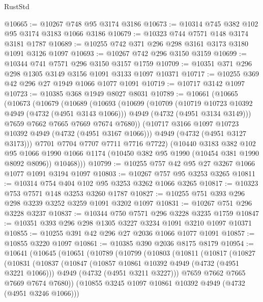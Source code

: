\begin{lexlean}{RustStd}
\begin{coremodule}
@10665 := @10267 @748 @95 @3174 @3186
@10673 := @10314 @745 @382 @102 @95 @3174 @3183 @1066 @3186
@10679 := @10323 @744 @7571 @148 @3174 @3181 @1787
@10689 := @10255 @742 @371 @296 @298 @3161 @3173 @3180 @1091 @3126 @1097
@10693 := @10267 @742 @296 @3150 @3159
@10699 := @10344 @741 @7571 @296 @3150 @3157 @1759
@10709 := @10351 @371 @296 @298 @1305 @3149 @3156 @1091 @3133 @1097 @10371
@10717 := @10255 @369 @42 @296 @27 @1949 @1066 @1077 @1091
@10719 := @10717 @3142 @1097
@10723 := @10385 @368 @1949 @8027 @8031
@10789 := @10661
    (@10665
      (@10673
        (@10679
          (@10689
            (@10693
              (@10699
                (@10709
                  (@10719 @10723 @10392 @4949 (@4732 (@4951 @3143 @1066)))
                  @4949
                  (@4732 (@4951 @3134 @3149)))
                @7659
                @7662
                @7665
                @7669
                @7674
                @7680))
            (@10717 @3166 @1097 @10723 @10392 @4949 (@4732 (@4951 @3167 @1066)))
            @4949
            (@4732 (@4951 @3127 @3173)))
          @7701
          @7704
          @7707
          @7711
          @7716
          @7722)
        (@10440
          @3183
          @382
          @102
          @95
          @1066
          @1990
          @1066
          @1174
          (@10450 @382 @95 @1990 (@10454 @381 @1990 @8092 @8096))
          @10468)))
@10799 := @10255 @757 @42 @95 @27 @3267 @1066 @1077 @1091 @3194 @1097
@10803 := @10267 @757 @95 @3253 @3265
@10811 := @10314 @754 @404 @102 @95 @3253 @3262 @1066 @3265
@10817 := @10323 @753 @7571 @148 @3253 @3260 @1787
@10827 := @10255 @751 @393 @296 @298 @3239 @3252 @3259 @1091 @3202 @1097
@10831 := @10267 @751 @296 @3228 @3237
@10837 := @10344 @750 @7571 @296 @3228 @3235 @1759
@10847 := @10351 @393 @296 @298 @1305 @3227 @3234 @1091 @3210 @1097 @10371
@10855 := @10255 @391 @42 @296 @27 @2036 @1066 @1077 @1091
@10857 := @10855 @3220 @1097
@10861 := @10385 @390 @2036 @8175 @8179
@10954 := @10641
    (@10645
      (@10651
        (@10789
          (@10799
            (@10803
              (@10811
                (@10817
                  (@10827
                    (@10831
                      (@10837
                        (@10847
                          (@10857 @10861 @10392 @4949 (@4732 (@4951 @3221 @1066)))
                          @4949
                          (@4732 (@4951 @3211 @3227)))
                        @7659
                        @7662
                        @7665
                        @7669
                        @7674
                        @7680))
                    (@10855 @3245 @1097 @10861 @10392 @4949 (@4732 (@4951 @3246 @1066)))

\end{coremodule}
\end{lexlean}
